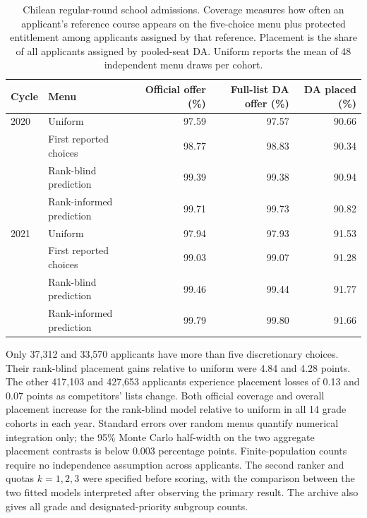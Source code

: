 \begin{table}[t]\centering\small
\caption{Chilean regular-round school admissions. Coverage measures how often an applicant's reference course appears on the five-choice menu plus protected entitlement among applicants assigned by that reference. Placement is the share of all applicants assigned by pooled-seat DA. Uniform reports the mean of 48 independent menu draws per cohort.}
\label{tab:sae}\begin{tabular}{@{}llrrr@{}}\toprule
Cycle & Menu & Official offer (\%) & Full-list DA offer (\%) & DA placed (\%)\\\midrule
2020 & Uniform & 97.59 & 97.57 & 90.66\\
 & First reported choices & 98.77 & 98.83 & 90.34\\
 & Rank-blind prediction & 99.39 & 99.38 & 90.94\\
 & Rank-informed prediction & 99.71 & 99.73 & 90.82\\\midrule
2021 & Uniform & 97.94 & 97.93 & 91.53\\
 & First reported choices & 99.03 & 99.07 & 91.28\\
 & Rank-blind prediction & 99.46 & 99.44 & 91.77\\
 & Rank-informed prediction & 99.79 & 99.80 & 91.66\\\bottomrule\end{tabular}\end{table}

Only 37,312 and 33,570 applicants have more than five discretionary choices. Their rank-blind placement gains relative to uniform were 4.84 and 4.28 points. The other 417,103 and 427,653 applicants experience placement losses of 0.13 and 0.07 points as competitors' lists change. Both official coverage and overall placement increase for the rank-blind model relative to uniform in all 14 grade cohorts in each year. Standard errors over random menus quantify numerical integration only; the 95\% Monte Carlo half-width on the two aggregate placement contrasts is below 0.003 percentage points. Finite-population counts require no independence assumption across applicants. The second ranker and quotas $k=1,2,3$ were specified before scoring, with the comparison between the two fitted models interpreted after observing the primary result. The archive also gives all grade and designated-priority subgroup counts.

